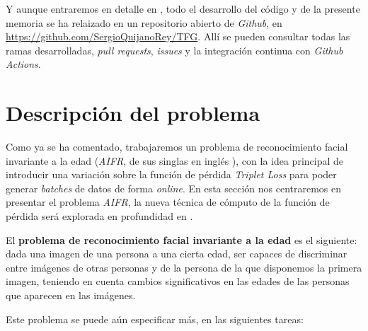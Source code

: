 Y aunque entraremos en detalle en , todo el desarrollo del código y de la presente memoria se ha relaizado en un repositorio abierto de \textit{Github}, en \url{https://github.com/SergioQuijanoRey/TFG}. Allí se pueden consultar todas las ramas desarrolladas, \textit{pull requests}, \textit{issues} y la integración continua con \textit{Github Actions}.

\section{Descripción del problema} \label{ich:descrp_problema}

Como ya se ha comentado, trabajaremos un problema de reconocimiento facial invariante a la edad (\textit{AIFR}, de sus singlas en inglés ), con la idea principal de introducir una variación sobre la función de pérdida \textit{Triplet Loss} para poder generar \textit{batches} de datos de forma \textit{online}. En esta sección nos centraremos en presentar el problema \textit{AIFR}, la nueva técnica de cómputo de la función de pérdida será explorada en profundidad en .

El \textbf{problema de reconocimiento facial invariante a la edad} es el siguiente: dada una imagen de una persona a una cierta edad, ser capaces de discriminar entre imágenes de otras personas y de la persona de la que disponemos la primera imagen, teniendo en cuenta cambios significativos en las edades de las personas que aparecen en las imágenes.

Este problema se puede aún especificar más, en las siguientes tareas:


